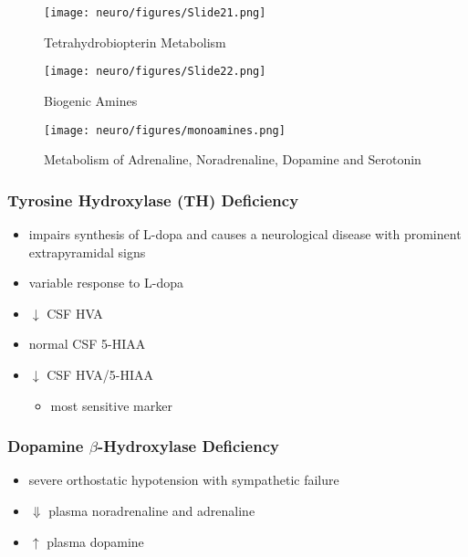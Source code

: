 \documentclass[12pt]{scrartcl}
\begin{document}
\begin{figure}[htbp]
\centering
\texttt{[image: neuro/figures/Slide21.png]}
\caption{\label{fig:org53a0868}Tetrahydrobiopterin Metabolism}
\end{figure}

\begin{figure}[htbp]
\centering
\texttt{[image: neuro/figures/Slide22.png]}
\caption{\label{fig:orgbbeee32}Biogenic Amines}
\end{figure}

\begin{figure}[htbp]
\centering
\texttt{[image: neuro/figures/monoamines.png]}
\caption{\label{fig:orgbb95e2c}Metabolism of Adrenaline, Noradrenaline, Dopamine and Serotonin}
\end{figure}


\subsubsection{Tyrosine Hydroxylase (TH) Deficiency}
\label{sec:org72b8c1d}
\begin{itemize}
\item impairs synthesis of L-dopa and causes a neurological disease with
prominent extrapyramidal signs
\item variable response to L-dopa
\item \(\downarrow\) CSF HVA
\item normal CSF 5-HIAA
\item \(\downarrow\) CSF HVA/5-HIAA
\begin{itemize}
\item most sensitive marker
\end{itemize}
\end{itemize}
\subsubsection{Dopamine \(\beta\)-Hydroxylase Deficiency}
\label{sec:org8ba9866}
\begin{itemize}
\item severe orthostatic hypotension with sympathetic failure
\item \(\Downarrow\) plasma noradrenaline and adrenaline
\item \(\uparrow\) plasma dopamine
\end{itemize}
\end{document}

